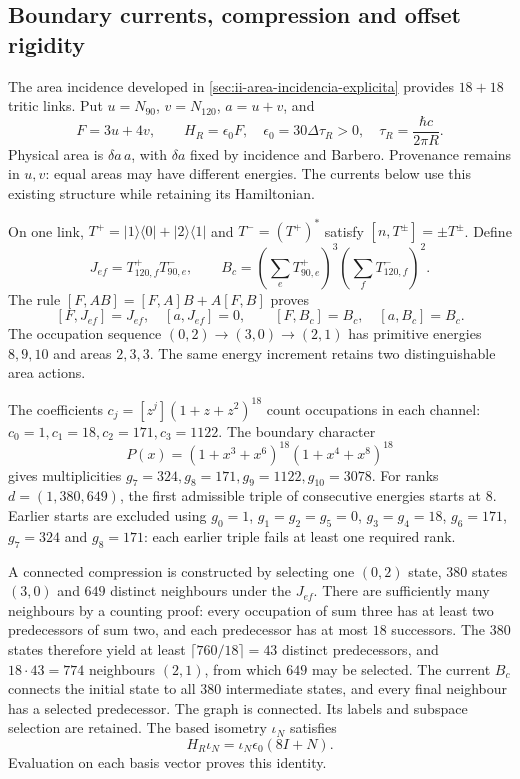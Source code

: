 \subsection{Boundary currents, compression and offset rigidity}
\label{sec:ii-ter27-corrientes}

The area incidence developed in \ref{sec:ii-area-incidencia-explicita}
provides $18+18$ tritic links. Put $u=N_{90}$, $v=N_{120}$, $a=u+v$,
and
\[
 F=3u+4v,\qquad H_R=\epsilon_0F,
 \quad\epsilon_0=30\Delta\tau_R>0,
 \quad\tau_R=\frac{\hbar c}{2\pi R}.
\]
Physical area is $\delta a\,a$, with $\delta a$ fixed by incidence
and Barbero. Provenance remains in $u,v$: equal areas may have different
energies. The currents below use this existing structure while retaining
its Hamiltonian.

On one link, $T^+=|1\rangle\langle0|+|2\rangle\langle1|$ and
$T^-=(T^+)^*$ satisfy $[n,T^\pm]=\pm T^\pm$. Define
\[
 J_{ef}=T^+_{120,f}T^-_{90,e},\qquad
 B_c=\left(\sum_eT^+_{90,e}\right)^3
     \left(\sum_fT^-_{120,f}\right)^2.
\]
The rule $[F,AB]=[F,A]B+A[F,B]$ proves
\[
 [F,J_{ef}]=J_{ef},\quad[a,J_{ef}]=0,
 \qquad[F,B_c]=B_c,\quad[a,B_c]=B_c.
\]
The occupation sequence $(0,2)\to(3,0)\to(2,1)$ has primitive
energies $8,9,10$ and areas $2,3,3$. The same energy increment retains
two distinguishable area actions.

The coefficients $c_j=[z^j](1+z+z^2)^{18}$ count occupations in each
channel: $c_0=1,c_1=18,c_2=171,c_3=1122$. The boundary character
\[
 P(x)=(1+x^3+x^6)^{18}(1+x^4+x^8)^{18}
\]
gives multiplicities $g_7=324,g_8=171,g_9=1122,g_{10}=3078$.
For ranks $d=(1,380,649)$, the first admissible triple of consecutive
energies starts at $8$. Earlier starts are excluded using $g_0=1$,
$g_1=g_2=g_5=0$, $g_3=g_4=18$, $g_6=171$, $g_7=324$ and $g_8=171$:
each earlier triple fails at least one required rank.

A connected compression is constructed by selecting one $(0,2)$ state,
$380$ states $(3,0)$ and $649$ distinct neighbours under the $J_{ef}$.
There are sufficiently many neighbours by a counting proof: every
occupation of sum three has at least two predecessors of sum two,
and each predecessor has at most $18$ successors. The $380$ states
therefore yield at least $\lceil760/18\rceil=43$ distinct predecessors,
and $18\cdot43=774$ neighbours $(2,1)$, from which $649$ may be selected.
The current $B_c$ connects the initial state to all $380$ intermediate
states, and every final neighbour has a selected predecessor. The graph
is connected. Its labels and subspace selection are retained. The based
isometry $\iota_N$ satisfies
\begin{equation}
 H_R\iota_N=\iota_N\epsilon_0(8I+N).
 \label{eq:ii-ter27-compresion}
\end{equation}
Evaluation on each basis vector proves this identity.

